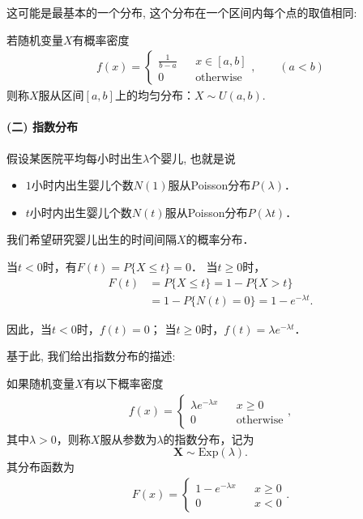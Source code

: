 这可能是最基本的一个分布, 这个分布在一个区间内每个点的取值相同:

\begin{definition}
    若随机变量$X$有概率密度
    \begin{align*}
        f(x)=\left\{\begin{array}{lcl}
                        \frac1{b-a} &  & x\in [a,b]       \\
                        0           &  & \mbox{otherwise}
                    \end{array}\right. ,\qquad (a<b)
    \end{align*}
    则称$X$服从区间$[a,b]$上的均匀分布：$X\sim U(a,b)$.
\end{definition}%


\paragraph{(二) 指数分布}

假设某医院平均每小时出生$\lambda$个婴儿, 也就是说
\begin{itemize}
    \item $1$小时内出生婴儿个数$N(1)$服从Poisson分布$P(\lambda)$．
    \item $t$小时内出生婴儿个数$N(t)$服从Poisson分布$P(\lambda t)$．
\end{itemize}
我们希望研究婴儿出生的时间间隔$X$的概率分布．


当$t<0$时，有$F(t)=P\{X\le t\}=0$． 当$t\ge0$时，
\begin{align*}
    F(t) & =P\{X\le t\}=1-P\{X>t\}          \\
         & =1-P\{N(t)=0\}=1-e^{-\lambda t}.
\end{align*}

因此，当$t<0$时，$f(t)=0$； 当$t\ge0$时，$f(t)=\lambda e^{-\lambda t}$．

基于此, 我们给出指数分布的描述:
\begin{definition}
    如果随机变量$X$有以下概率密度
    \begin{align*}
        f(x)=\left\{\begin{array}{lcl}
                        \lambda e^{-\lambda x} &  & x\ge 0           \\
                        0                      &  & \mbox{otherwise}
                    \end{array}\right. ,
    \end{align*}
    其中$\lambda>0$，则称$X$服从参数为$\lambda$的指数分布，记为
    \[\pmb X\sim \text{Exp}(\lambda). \]
    其分布函数为
    \begin{align*}
        F(x)=\left\{\begin{array}{lcl}
                        1- e^{-\lambda x} &  & x\ge 0 \\
                        0                 &  & x<0
                    \end{array}\right. .
    \end{align*}
\end{definition}

